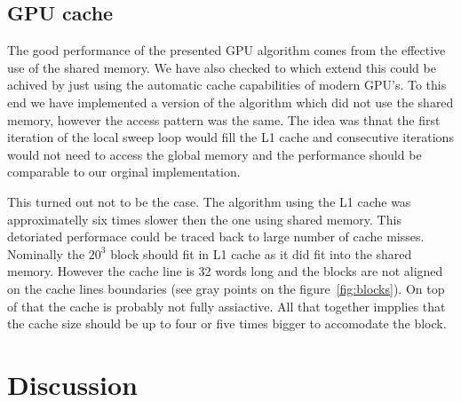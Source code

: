 \documentclass[a4paper]{llncs}
\begin{document}

\subsection{GPU cache}

The good performance of the presented GPU algorithm comes from the
effective use of the shared memory. We have also checked to which
extend this could be achived by just using the automatic cache
capabilities of modern GPU's. To this end we have implemented a
version of the algorithm which did not use the shared memory, however
the access pattern was the same. The idea was thnat the first
iteration of the local sweep loop would fill the L1 cache and
consecutive iterations would not need to access the global memory and the performance should be comparable to our orginal implementation. 

This turned out not to be the case. The algorithm using the L1 cache
was approximatelly six times slower then the one using shared
memory. This detoriated performace could be traced back to large
number of cache misses. Nominally the $20^3$ block should fit in L1
cache as it did fit into the shared memory. However the cache line is
32 words long and the blocks are not aligned on the cache lines
boundaries (see gray points on the figure~\ref{fig:blocks}). On top of
that the cache is probably not fully assiactive. All that together
impplies that the cache size should be up to four or five times bigger
to accomodate the block. 


\section{Discussion}
\end{document}
